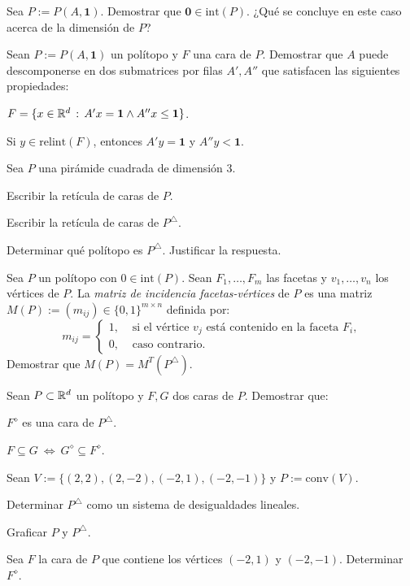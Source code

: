 \documentclass[a4paper,12pt]{article}
\newcommand{\Ppolar}[1]{#1^{\bigtriangleup}}
\newcommand{\Fpolar}[1]{#1^{\diamond}}
\renewcommand{\conv}[1]{\mathrm{conv}\left(#1\right)}
\newcommand{\relint}[1]{\mathrm{relint}\left(#1\right)}
\newcommand{\inter}[1]{\mathrm{int}\left(#1\right)}
\newcommand{\onevec}{\mathbf{1}}
\newcommand{\zerovec}{\mathbf{0}}
\begin{document}
\begin{exerciselist}
\item Sea $P := P(A, \onevec)$. Demostrar que $\zerovec \in \inter{P}$. ¿Qué se concluye en este caso acerca de la dimensión de $P$?

\item Sean $P := P(A, \onevec)$ un polítopo y $F$ una cara de $P$. Demostrar que $A$ puede descomponerse en dos submatrices por filas $A', A''$ que satisfacen las siguientes propiedades:
\begin{exerciselist}
  \item $F = \{ x \in \RR^d \, : \, A'x = \onevec \wedge A''x \leq \onevec \}$.
  \item Si $y \in \relint{F}$, entonces $A'y = \onevec$ y $A''y < \onevec$.
\end{exerciselist}

\item Sea $P$ una pirámide cuadrada de dimensión 3.
\begin{exerciselist}
\item Escribir  la retícula de caras de $P$.
\item Escribir la retícula de caras de $\Ppolar{P}$.
\item Determinar qué polítopo es $\Ppolar{P}$. Justificar la respuesta.
\end{exerciselist}

\item Sea $P$ un polítopo con $0 \in \mathrm{int}(P)$. Sean $F_1, \ldots, F_m$ las facetas y $v_1, \ldots, v_n$ los vértices de $P$. La \emph{matriz de incidencia facetas-vértices} de $P$ es una matriz $M(P) := (m_{ij}) \in \{0, 1\}^{m \times n}$ definida por:
$$
m_{ij} = \left\{
\begin{array}{ll}
1, & \mbox{ si el vértice $v_j$ está contenido en la faceta $F_i$,}\\
0, & \mbox{ caso contrario.}
\end{array}
\right.
$$
Demostrar que $M(P) = M^T(\Ppolar{P})$.

\item Sean $P \subset \mathbb{R}^d$ un polítopo y $F, G$ dos caras de $P$. Demostrar que:
\begin{exerciselist}
  \item $\Fpolar{F}$ es una cara de $\Ppolar{P}$.
  \item $F \subseteq G \: \Leftrightarrow \: \Fpolar{G} \subseteq \Fpolar{F}$.
\end{exerciselist}

\item Sean $V:= \{ (2,2), (2, -2), (-2, 1), (-2,-1) \}$ y $P:= \conv{V}$.
\begin{exerciselist}
\item Determinar $\Ppolar{P}$ como un sistema de desigualdades lineales.
\item Graficar $P$ y $\Ppolar{P}$.
\item Sea $F$ la cara de $P$ que contiene los vértices $(-2, 1)$ y $(-2,-1)$. Determinar $\Fpolar{F}$.
\end{exerciselist}


\end{exerciselist}
\end{document}
